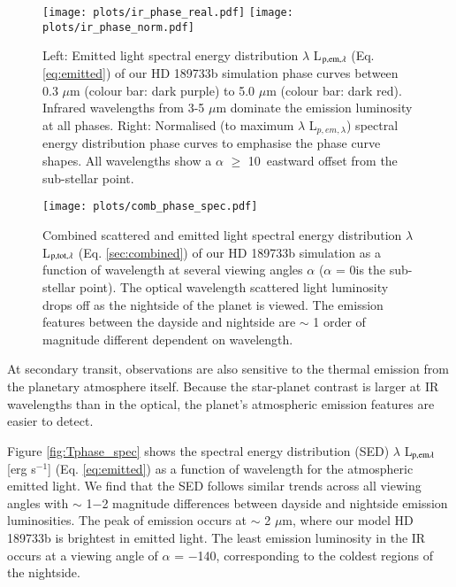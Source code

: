 \documentclass{aa}
\begin{document}
\begin{figure*}
   \centering
   \texttt{[image: plots/ir\_phase\_real.pdf]}       
   \texttt{[image: plots/ir\_phase\_norm.pdf]} 
   \caption{Left: Emitted light spectral energy distribution $\lambda$ L$_{\rm p,em,\lambda}$ (Eq. \ref{eq:emitted}) of our HD 189733b simulation phase curves between 0.3 $\mu$m (colour bar: dark purple) to 5.0 $\mu$m (colour bar: dark red).
   Infrared wavelengths from 3-5 $\mu$m dominate the emission luminosity at all phases.
   Right: Normalised (to maximum $\lambda$ L$_{p,em,\lambda}$) spectral energy distribution phase curves to emphasise the phase curve shapes.
   All wavelengths show a $\alpha$ $\ge$ 10\degr\ eastward offset from the sub-stellar point.}
   \label{fig:Tphase}
\end{figure*}

\begin{figure*}
   \centering
   \texttt{[image: plots/comb\_phase\_spec.pdf]} 
   \caption{Combined scattered and emitted light spectral energy distribution $\lambda$ L$_{\rm p,tot,\lambda}$ (Eq. \ref{sec:combined}) of our HD 189733b simulation as a function of wavelength at several viewing angles $\alpha$ ($\alpha$ = 0\degr is the sub-stellar point).
   The optical wavelength scattered light luminosity drops off as the nightside of the planet is viewed.
   The emission features between the dayside and nightside are $\sim$ 1 order of magnitude different dependent on wavelength.}
   \label{fig:comb_phase_spec}
\end{figure*}

At secondary transit, observations are also sensitive to the thermal emission from the planetary atmosphere itself.
Because the star-planet contrast is larger at IR wavelengths than in the optical, the planet's atmospheric emission features are easier to detect.

Figure \ref{fig:Tphase_spec} shows the spectral energy distribution (SED) $\lambda$ L$_{\rm p, em \lambda}$ [erg s$^{-1}$] (Eq. \ref{eq:emitted}) as a function of wavelength for the atmospheric emitted light.
We find that the SED follows similar trends across all viewing angles with $\sim$ 1$-$2 magnitude differences between dayside and nightside emission luminosities.
The peak of emission occurs at $\sim$ 2 $\mu$m, where our model HD 189733b is brightest in emitted light.
The least emission luminosity in the IR occurs at a viewing angle of $\alpha$ = $-$140\degr, corresponding to the coldest regions of the nightside.
\end{document}
